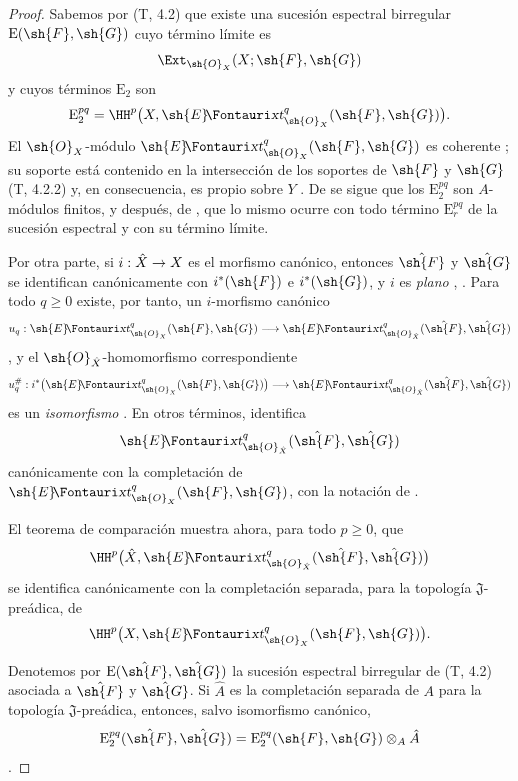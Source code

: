 \documentclass[oneside]{amsart}
\makeatletter
\renewcommand{\geq}{\geqslant}
\newcommand{\ega@arrow}[2]{\mathchoice{#1}{#2}{#2}{#2}}
\renewcommand{\to}{\ega@arrow{\longrightarrow}{\rightarrow}}
\newcommand*{\ega@sheafop}[3]{\sh{#1}#2\textup{\kern-2.2pt{\Fontauri\slshape #3}}}
\newcommand*{\shExt}{\ega@sheafop{E}{}{xt}}
\newcommand{\oldpage}[2][]{{\marginnote{\normalfont\textbf{#1}~|~#2}}\ignorespaces}
\makeatother
\begin{document}
\begin{proof}
Sabemos por (T, 4.2) que existe una sucesión espectral birregular
$\mathrm{E}(\sh{F},\sh{G})$ cuyo término límite es
\[
  \Ext_{\sh{O}_X}(X;\sh{F},\sh{G})
\]
y cuyos términos $\mathrm{E}_2$ son
\[
  \mathrm{E}_2^{pq}
  =\HH^p\bigl(X,\shExt^q_{\sh{O}_X}(\sh{F},\sh{G})\bigr).
\]
El $\sh{O}_X$-módulo
$\shExt^q_{\sh{O}_X}(\sh{F},\sh{G})$ es coherente
; su soporte está contenido en la intersección de
los soportes de $\sh{F}$ y $\sh{G}$ (T, 4.2.2) y, en consecuencia, es
propio sobre $Y$ . De  se sigue
que los $\mathrm{E}_2^{pq}$ son $A$-módulos finitos, y después, de
, que lo mismo ocurre con todo término
$\mathrm{E}_r^{pq}$ de la sucesión espectral y con su término límite.

Por otra parte, si $i:\hat{X}\to X$ es el morfismo canónico, entonces
$\hat{\sh{F}}$ y $\hat{\sh{G}}$ se identifican canónicamente con
$i^*(\sh{F})$ e $i^*(\sh{G})$, y $i$ es \emph{plano}
, . Para todo $q\geq0$ existe,
por tanto, un $i$-morfismo canónico
\[
  u_q:\shExt^q_{\sh{O}_X}(\sh{F},\sh{G})
  \longrightarrow
  \shExt^q_{\sh{O}_{\hat{X}}}
    (\hat{\sh{F}},\hat{\sh{G}})
\]
, y el $\sh{O}_{\hat{X}}$-homomorfismo
correspondiente
\[
  u_q^\#:
  i^*\bigl(\shExt^q_{\sh{O}_X}(\sh{F},\sh{G})\bigr)
  \longrightarrow
  \shExt^q_{\sh{O}_{\hat{X}}}
    (\hat{\sh{F}},\hat{\sh{G}})
\]
es un \emph{isomorfismo} . En otros términos,
 identifica
\[
  \shExt^q_{\sh{O}_{\hat{X}}}
    (\hat{\sh{F}},\hat{\sh{G}})
\]
canónicamente con la completación de
$\shExt^q_{\sh{O}_X}(\sh{F},\sh{G})$, con la notación de
.

El teorema de comparación  muestra ahora, para todo
$p\geq0$, que
\[
  \HH^p\bigl(\hat{X},
    \shExt^q_{\sh{O}_{\hat{X}}}
      (\hat{\sh{F}},\hat{\sh{G}})\bigr)
\]
se identifica canónicamente con la completación separada, para la
topología $\mathfrak J$-preádica, de
\[
  \HH^p\bigl(X,\shExt^q_{\sh{O}_X}(\sh{F},\sh{G})\bigr).
\]

\oldpage[III]{139}

Denotemos por $\mathrm{E}(\hat{\sh{F}},\hat{\sh{G}})$ la sucesión
espectral birregular de (T, 4.2) asociada a $\hat{\sh{F}}$ y
$\hat{\sh{G}}$. Si $\hat{A}$ es la completación separada de $A$ para
la topología $\mathfrak J$-preádica, entonces, salvo isomorfismo
canónico,
\[
  \mathrm{E}_2^{pq}(\hat{\sh{F}},\hat{\sh{G}})
  =
  \mathrm{E}_2^{pq}(\sh{F},\sh{G})\otimes_A\hat{A}
\]
.


\end{proof}
\end{document}
